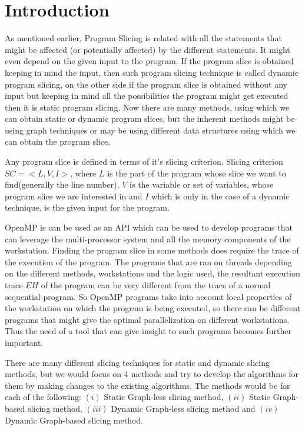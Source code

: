 \documentclass[conference]{IEEEtran}
\begin{document}
\section{Introduction}
As mentioned earlier, Program Slicing is related with all the statements that might be affected (or potentially affected) by the different statements\cite{b1}. It might even depend on the given input to the program. If the program slice is obtained keeping in mind the input, then such program slicing technique is called dynamic program slicing, on the other side if the program slice is obtained without any input but keeping in mind all the possibilities the program might get executed then it is static program slicing. Now there are many methods, using which we can obtain static or dynamic program slices, but the inherent methods might be using graph techniques or may be using different data structures using which we can obtain the program slice.
\par Any program slice is defined in terms of it's slicing criterion. Slicing criterion $SC= < L , V , I >$, where $L$ is the part of the program whose slice we want to find(generally the line number), $V$ is the variable or set of variables, whose program slice we are interested in and $I$ which is only in the case of a dynamic technique, is the given input for the program.
\par OpenMP is can be used as an API which can be used to develop programs that can leverage the multi-processor system and all the memory components of the  workstation. Finding the program slice in some methods does require the trace of the execution of the program. The programs that are ran on threads depending on the different methods, workstations and the logic used, the resultant execution trace $EH$ of the program can be very different from the trace of a normal sequential program. So OpenMP programs take into account local properties of the workstation on which the program is being executed, so there can be different programs that might give the optimal parallelization on different workstations. Thus the need of a tool that can give insight to such programs becomes further important.   
\par There are many different slicing techniques for static and dynamic slicing methods, but we would focus on 4 methods and try to develop the algorithms for them by making changes to the existing algorithms. The methods would be for each of the following: $(i)$ Static Graph-less slicing method, $(ii)$ Static Graph-based slicing method, $(iii)$ Dynamic Graph-less slicing method and $(iv)$ Dynamic Graph-based slicing method.
\end{document}
